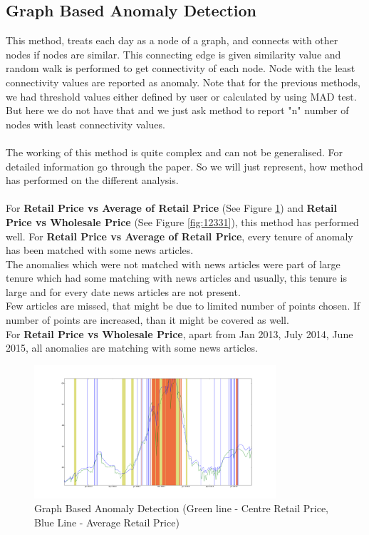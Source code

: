 \documentclass[a4paper,10pt]{report}
\begin{document}
		
\subsection{Graph Based Anomaly Detection}

	This method, treats each day as a node of a graph, and connects with other nodes if nodes are similar. This connecting edge is given similarity value and random walk is performed to get connectivity of each node. Node with the least connectivity values are reported as anomaly. Note that for the previous methods, we had threshold values either defined by user or calculated by using MAD test. But here we do not have that and we just ask method to report "n" number of nodes with least connectivity values.\\
	\\
	The working of this method is quite complex and can not be generalised. For detailed information go through the paper. So we will just represent, how method has performed on the different analysis.\\
	\\
	For \textbf{Retail Price vs Average of Retail Price} (See Figure \ref{fig:1231}) and \textbf{Retail Price vs Wholesale Price} (See Figure \ref{fig:12331}), this method has performed well. For \textbf{Retail Price vs Average of Retail Price}, every tenure of anomaly has been matched with some news articles.
	\\
	The anomalies which were not matched with news articles were part of large tenure which had some matching with news articles and usually, this tenure is large and for every date news articles are not present. 
	\\
	Few articles are missed, that might be due to limited number of points chosen. If number of points are increased, than it might be covered as well. 
	\\
	For \textbf{Retail Price vs Wholesale Price}, apart from Jan 2013, July 2014, June 2015, all anomalies are matching with some news articles.\\
			\begin{figure}[H]
		    	\centering
  		    	\includegraphics[width=0.8\textwidth]{graphs/1231.png}
		    	\caption{Graph Based Anomaly Detection (Green line - Centre Retail Price, Blue Line - Average Retail Price)}
		    	\label{fig:1231}
			\end{figure}
			
\end{document}
